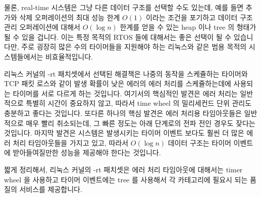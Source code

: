 물론, real-time 시스템은 그냥 다른 데이터 구조를 선택할 수도 있는데, 예를 들면
추가와 삭제 오퍼레이션의 최대 성능 한계 $O(1)$ 이라는 조건을 포기하고 데이터
구조 관리 오퍼레이션에 대해서 $O(\log n)$ 한계를 얻을 수 있는 heap 이나 tree 의
형태가 될 수 있을 겁니다.
이는 특정 목적의 RTOS 들에 대해서는 좋은 선택이 될 수 있습니다만, 주로 굉장히
많은 수의 타이머들을 지원해야 하는 리눅스와 같은 범용 목적의 시스템들에서는
비효율적입니다.

리눅스 커널의 -rt 패치셋에서 선택된 해결책은 나중의 동작을 스케쥴하는 타이머와
TCP 패킷 로스와 같이 발생 확률이 낮은 에러의 에러 처리를 스케쥴하는데에
사용되는 타이머를 서로 다르게 하는 것입니다.
여기서의 핵심적인 발견은 에러 처리는 일반적으로 특별히 시간이 중요하지 않고,
따라서 time wheel 의 밀리세컨드 단위 관리도 충분하고 좋다는 것입니다.
또다른 하나의 핵심 발견은 에러 처리용 타임아웃들은 일반적으로 매우 빨리
취소되는데, 그 빠른 정도는 아래 단계로의 전파 전인 경우도 잦다는 것입니다.
마지막 발견은 시스템은 발생시키는 타이머 이벤트 보다도 훨씬 더 많은 에러 처리
타임아웃들을 가지고 있고, 따라서 $O(\log n)$ 데이터 구조는 타이머 이벤트에
받아들여질만한 성능을 제공해야 한다는 것입니다.

짧게 정리해서, 리눅스 커널의 -rt 패치셋은 에러 처리 타임아웃에 대해서는 timer
wheel 을 사용하고 타이머 이벤트에는 tree 를 사용해서 각 카테고리에 필요시 되는
품질의 서비스를 제공합니다.
\iffalse

